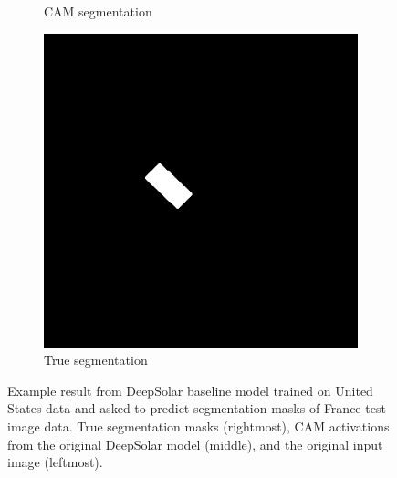 \documentclass[10pt,twocolumn,letterpaper]{article}
\begin{document}
\begin{figure}[htp]
\begin{subfigure}{.3\textwidth}
    \caption{CAM segmentation}
\end{subfigure}
\begin{subfigure}{.3\textwidth}
    \centering
    \includegraphics[width=.95\linewidth]{example_true_seg.png}  
    \caption{True segmentation}
\end{subfigure}
\caption{Example result from DeepSolar baseline model trained on United States data and asked to predict segmentation masks of France test image data. True segmentation masks (rightmost), CAM activations from the original DeepSolar model (middle), and the original input image (leftmost).}
\label{FIGURE LABEL}
\end{figure}
\end{document}
